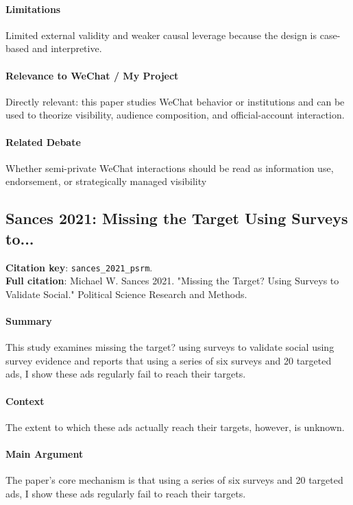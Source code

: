 \documentclass[12pt]{article}
\begin{document}
\paragraph{Limitations} Limited external validity and weaker causal leverage because the design is case-based and interpretive.

\paragraph{Relevance to WeChat / My Project} Directly relevant: this paper studies WeChat behavior or institutions and can be used to theorize visibility, audience composition, and official-account interaction.

\paragraph{Related Debate} Whether semi-private WeChat interactions should be read as information use, endorsement, or strategically managed visibility


\subsection{Sances 2021: Missing the Target Using Surveys to...}
\textbf{Citation key}: \texttt{sances\_2021\_psrm}.\\
\textbf{Full citation}: Michael W. Sances 2021. "Missing the Target? Using Surveys to Validate Social." Political Science Research and Methods.

\paragraph{Summary} This study examines missing the target? using surveys to validate social using survey evidence and reports that using a series of six surveys and 20 targeted ads, I show these ads regularly fail to reach their targets.

\paragraph{Context} The extent to which these ads actually reach their targets, however, is unknown.

\paragraph{Main Argument} The paper's core mechanism is that using a series of six surveys and 20 targeted ads, I show these ads regularly fail to reach their targets.
\end{document}
